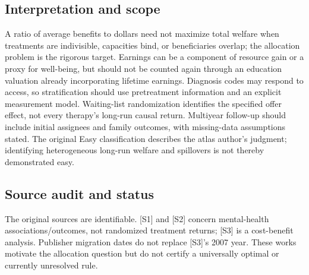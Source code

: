 \documentclass[11pt,a4paper]{article}
\begin{document}
\subsection*{Interpretation and scope}
A ratio of average benefits to dollars need not maximize total welfare when treatments are indivisible, capacities bind, or beneficiaries overlap; the allocation problem is the rigorous target. Earnings can be a component of resource gain or a proxy for well-being, but should not be counted again through an education valuation already incorporating lifetime earnings. Diagnosis codes may respond to access, so stratification should use pretreatment information and an explicit measurement model. Waiting-list randomization identifies the specified offer effect, not every therapy's long-run causal return. Multiyear follow-up should include initial assignees and family outcomes, with missing-data assumptions stated. The original Easy classification describes the atlas author's judgment; identifying heterogeneous long-run welfare and spillovers is not thereby demonstrated easy.

\subsection*{Source audit and status}
The original sources are identifiable. [S1] and [S2] concern mental-health associations/outcomes, not randomized treatment returns; [S3] is a cost-benefit analysis. Publisher migration dates do not replace [S3]'s 2007 year. These works motivate the allocation question but do not certify a universally optimal or currently unresolved rule.
\end{document}
